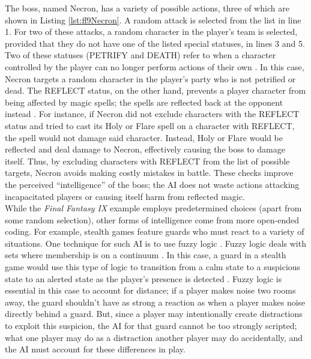 The boss, named Necron, has a variety of possible actions, three of which are shown in Listing \ref{lst:ff9Necron}. A random attack is selected from the list in line 1. For two of these attacks, a random character in the player's team is selected, provided that they do not have one of the listed special statuses, in lines 3 and 5. Two of these statuses (PETRIFY and DEATH) refer to when a character controlled by the player can no longer perform actions of their own \cite{ffIX00}. In this case, Necron targets a random character in the player's party who is not petrified or dead. The REFLECT status, on the other hand, prevents a player character from being affected by magic spells; the spells are reflected back at the opponent instead \cite{ffIX00}. For instance, if Necron did not exclude characters with the REFLECT status and tried to cast its Holy or Flare spell on a character with REFLECT, the spell would not damage said character. Instead, Holy or Flare would be reflected and deal damage to Necron, effectively causing the boss to damage itself. Thus, by excluding characters with REFLECT from the list of possible targets, Necron avoids making costly mistakes in battle. These checks improve the perceived ``intelligence'' of the boss; the AI does not waste actions attacking incapacitated players or causing itself harm from reflected magic.\\

While the \textit{Final Fantasy IX} example employs predetermined choices (apart from some random selection), other forms of intelligence come from more open-ended coding. For example, stealth games feature guards who must react to a variety of situations. One technique for such AI is to use fuzzy logic \cite{schw04}. Fuzzy logic deals with sets where membership is on a continuum \cite{zade65}. In this case, a guard in a stealth game would use this type of logic to transition from a calm state to a suspicious state to an alerted state as the player's presence is detected \cite{schw04}. Fuzzy logic is essential in this case to account for distance; if a player makes noise two rooms away, the guard shouldn't have as strong a reaction as when a player makes noise directly behind a guard. But, since a player may intentionally create distractions to exploit this suspicion, the AI for that guard cannot be too strongly scripted; what one player may do as a distraction another player may do accidentally, and the AI must account for these differences in play.\\

